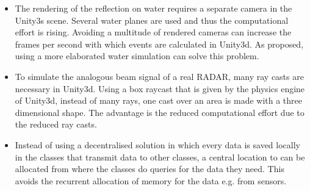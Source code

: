 \begin{itemize}
	\item The rendering of the reflection on water requires a separate camera in the Unity3s scene. Several water planes are used and thus the computational effort is rising. Avoiding a multitude of rendered cameras can increase the frames per second with which events are calculated in Unity3d. As proposed, using a more elaborated water simulation can solve this problem.
	\item To simulate the analogous beam signal of a real \ac{RADAR}, many ray casts are necessary in Unity3d. Using a box raycast that is given by the physics engine of Unity3d, instead of many rays, one cast over an area is made with a three dimensional shape. The advantage is the reduced computational effort due to the reduced ray casts.
	\item Instead of using a decentralised solution in which every data is saved locally in the classes that transmit data to other classes, a central location to can be allocated from where the classes do queries for the data they need. This avoids the recurrent allocation of memory for the data e.g. from sensors.
	
\end{itemize}
